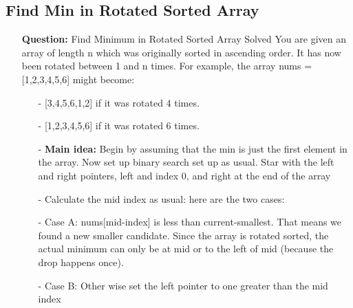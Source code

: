 \documentclass[12pt]{article}
\begin{document}
\subsection{Find Min in Rotated Sorted Array}
\begin{enumerate}
  \item[] \textbf{Question:} Find Minimum in Rotated Sorted Array
Solved 
You are given an array of length n which was originally sorted in ascending order. It has now been rotated between 1 and n times. For example, the array nums = [1,2,3,4,5,6] might become:

\begin{enumerate}
  \item[-] [3,4,5,6,1,2] if it was rotated 4 times.
  \item[-] [1,2,3,4,5,6] if it was rotated 6 times.
\end{enumerate}

    \begin{enumerate}
      \item[-] \textbf{Main idea:} Begin by assuming that the min is just the first element in the array. Now set up binary search set up as usual. Star with the left and right pointers, left and index 0, and right at the end of the array
      \item[-] Calculate the mid index as usual: here are the two cases:
      \item[-] Case A: nums[mid-index] is less than current-smallest. That means we found a new smaller candidate. Since the array is rotated sorted, the actual minimum can only be at mid or to the left of mid (because the drop happens once).
      \item[-] Case B: Other wise set the left pointer to one greater than the mid index

    \end{enumerate}
\end{enumerate}
\end{document}
